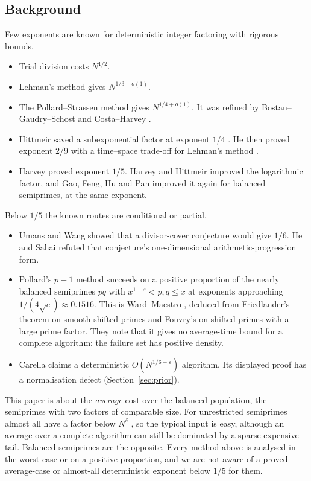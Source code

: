 \documentclass[11pt]{amsart}
\theoremstyle{definition}
\begin{document}
\subsection{Background}
Few exponents are known for deterministic integer factoring with rigorous bounds.
\begin{itemize}
\item Trial division costs $N^{1/2}$.
\item Lehman's method \cite{lehman1974} gives $N^{1/3+o(1)}$.
\item The Pollard--Strassen method \cite{pollard1974,strassen1976} gives $N^{1/4+o(1)}$. It was
  refined by Bostan--Gaudry--Schost \cite{bgs2007} and Costa--Harvey \cite{costaharvey}.
\item Hittmeir saved a subexponential factor at exponent $1/4$ \cite{hittmeir2018}. He then
  proved exponent $2/9$ with a time--space trade-off for Lehman's method \cite{hittmeir2021}.
\item Harvey \cite{harvey2021} proved exponent $1/5$. Harvey and Hittmeir \cite{hh2022}
  improved the logarithmic factor, and Gao, Feng, Hu and Pan \cite{gao2025} improved it again
  for balanced semiprimes, at the same exponent.
\end{itemize}
Below $1/5$ the known routes are conditional or partial.
\begin{itemize}
\item Umans and Wang \cite{umanswang2025} showed that a divisor-cover conjecture would give
  $1/6$. He and Sahai \cite{hesahai2026} refuted that conjecture's one-dimensional
  arithmetic-progression form.
\item Pollard's $p-1$ method succeeds on a positive proportion of the nearly balanced semiprimes
  $pq$ with $x^{1-\varepsilon}<p,q\le x$ at
  exponents approaching $1/(4\sqrt e)\approx0.1516$. This is Ward--Maestro
  \cite[Prop.~35.3]{wardmaestro2026}, deduced from Friedlander's theorem on smooth shifted primes
  \cite{friedlander1989} and Fouvry's on shifted primes with a large prime factor. They note
  that it gives no average-time bound for a complete algorithm: the failure set has positive
  density.
\item Carella \cite{carella} claims a deterministic $O(N^{1/6+\varepsilon})$ algorithm. Its
  displayed proof has a normalisation defect (Section~\ref{sec:prior}).
\end{itemize}

This paper is about the \emph{average} cost over the balanced population, the semiprimes with
two factors of comparable size. For unrestricted semiprimes almost all have a factor below
$N^{\delta}$ \cite{crisanerban}, so the typical input is easy, although an average over a
complete algorithm can still be dominated by a sparse expensive tail. Balanced semiprimes are
the opposite. Every method above is analysed in the worst case or on a positive proportion,
and we are not aware of a proved average-case or almost-all deterministic exponent below $1/5$
for them.
\end{document}
